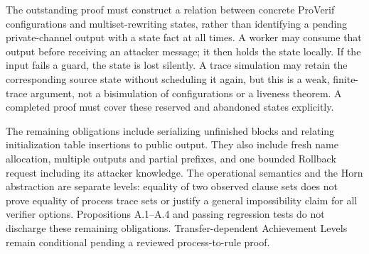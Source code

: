 The outstanding proof must construct a relation between concrete
ProVerif configurations and multiset-rewriting states, rather than
identifying a pending private-channel output with a state fact at all
times. A worker may consume that output before receiving an attacker
message; it then holds the state locally. If the input fails a guard,
the state is lost silently. A trace simulation may retain the
corresponding source state without scheduling it again, but this is a
weak, finite-trace argument, not a bisimulation of configurations or a
liveness theorem. A completed proof must cover these reserved and
abandoned states explicitly.

The remaining obligations include serializing unfinished blocks and
relating initialization table insertions to public output. They also
include fresh name allocation, multiple outputs and partial prefixes,
and one bounded Rollback request including its attacker knowledge. The operational
semantics and the Horn abstraction are separate levels: equality of
two observed clause sets does not prove equality of process trace sets
or justify a general impossibility claim for all verifier options.
Propositions A.1--A.4 and passing regression tests do not discharge these
remaining obligations. Transfer-dependent Achievement Levels remain
conditional pending a reviewed process-to-rule proof.
